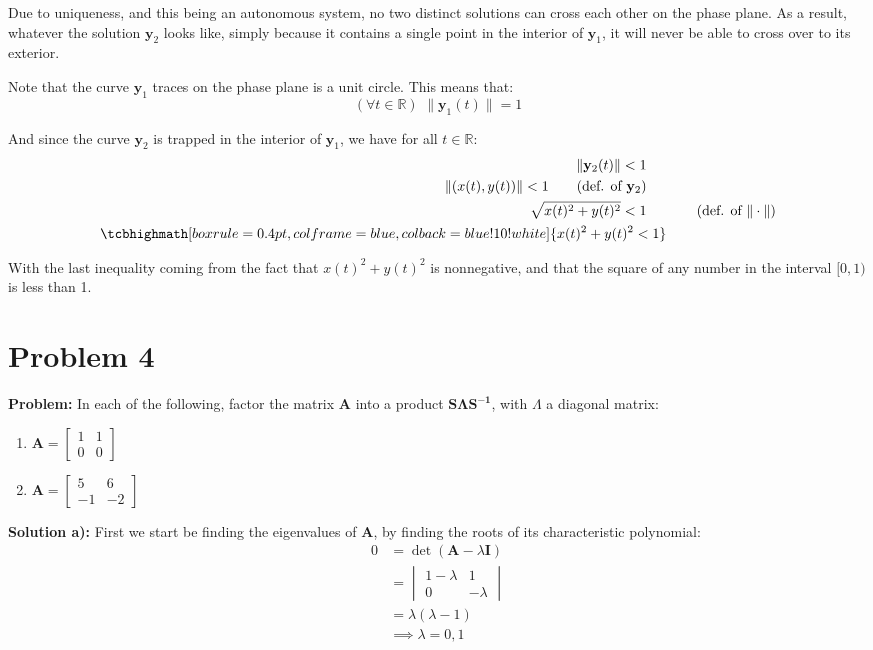 \documentclass{article}
\begin{document}
Due to uniqueness, and this being an autonomous system, no two distinct solutions can cross each other on the phase plane. As a result, whatever the solution $\mathbf{y}_2$ looks like, simply because it contains a single point in the interior of $\mathbf{y}_1$, it will never be able to cross over to its exterior.

Note that the curve $\mathbf{y}_1$ traces on the phase plane is a unit circle. This means that:
\begin{equation*}
    (\forall t\in\mathbb R)\,\,\|\mathbf{y}_1(t)\|=1
\end{equation*} 

And since the curve $\mathbf{y}_2$ is trapped in the interior of $\mathbf{y}_1$, we have for all $t\in\mathbb R$:
\begin{align*}
    \|\mathbf{y}_2(t)\|<1\phantom{aaa}&\\
    \|(x(t),y(t))\|<1\tag{def. of $\mathbf{y}_2$}\phantom{aaa}&\\
    \sqrt{x(t)^2+y(t)^2}<1\phantom{aaa}&\tag{def. of $\|\cdot\|$}\\
    \tcbhighmath[boxrule=0.4pt,colframe=blue,colback=blue!10!white]{x(t)^2+y(t)^2<1}\phantom{\,}&
\end{align*}

With the last inequality coming from the fact that $x(t)^2+y(t)^2$ is nonnegative, and that the square of any number in the interval $[0,1)$ is less than 1.
    
\section*{Problem 4}
\noindent\textbf{Problem:}  In each of the following, factor the matrix $\mathbf{A}$ into a product $\mathbf{S\Lambda S^{-1}}$, with $\Lambda$ a diagonal matrix:
\begin{enumerate}[label=\textbf{\alph*)}]
    \item $\mathbf{A}=\begin{bmatrix}1&1\\0&0\end{bmatrix}$
    \item $\mathbf{A}=\begin{bmatrix}5&6\\-1&-2\end{bmatrix}$
\end{enumerate}

\bigskip

\noindent\textbf{Solution a):} First we start be finding the eigenvalues of $\mathbf{A}$, by finding the roots of its characteristic polynomial:
\begin{align*}
    0&=\det(\mathbf{A}-\lambda \mathbf{I})\\
    &=\begin{vmatrix} 1-\lambda & 1 \\ 0 & -\lambda \end{vmatrix}\\
    &=\lambda(\lambda-1)\\
    &\implies \lambda=0,1
\end{align*}
\end{document}
